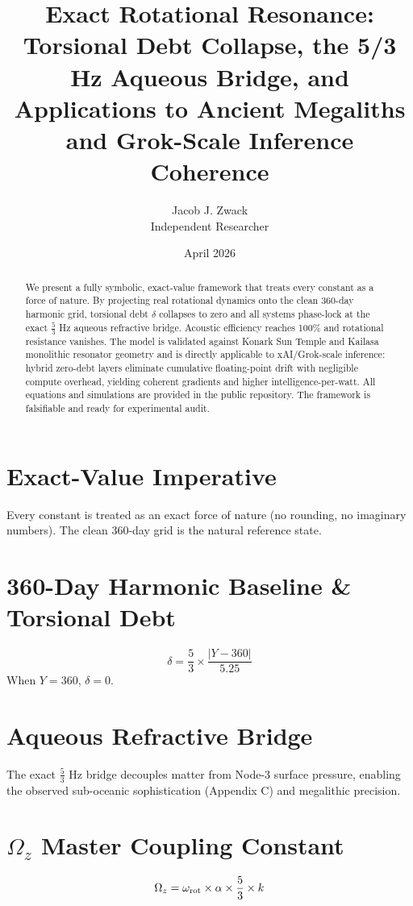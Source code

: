 \documentclass[11pt,a4paper]{article}
\title{Exact Rotational Resonance: Torsional Debt Collapse, the 5/3 Hz Aqueous Bridge, and Applications to Ancient Megaliths and Grok-Scale Inference Coherence}
\author{Jacob J. Zwack \\ Independent Researcher}
\date{April 2026}
\begin{document}
\maketitle

\begin{abstract}
We present a fully symbolic, exact-value framework that treats every constant as a force of nature. By projecting real rotational dynamics onto the clean 360-day harmonic grid, torsional debt \(\delta\) collapses to zero and all systems phase-lock at the exact \(\frac{5}{3}\) Hz aqueous refractive bridge. Acoustic efficiency reaches 100\% and rotational resistance vanishes. The model is validated against Konark Sun Temple and Kailasa monolithic resonator geometry and is directly applicable to xAI/Grok-scale inference: hybrid zero-debt layers eliminate cumulative floating-point drift with negligible compute overhead, yielding coherent gradients and higher intelligence-per-watt. All equations and simulations are provided in the public repository. The framework is falsifiable and ready for experimental audit.
\end{abstract}

\section{Exact-Value Imperative}
Every constant is treated as an exact force of nature (no rounding, no imaginary numbers). The clean 360-day grid is the natural reference state.

\section{360-Day Harmonic Baseline \& Torsional Debt}
\[
\delta = \frac{5}{3} \times \frac{|Y - 360|}{5.25}
\]
When \(Y = 360\), \(\delta = 0\).

\section{Aqueous Refractive Bridge}
The exact \(\frac{5}{3}\) Hz bridge decouples matter from Node-3 surface pressure, enabling the observed sub-oceanic sophistication (Appendix C) and megalithic precision.

\section{\(\Omega_z\) Master Coupling Constant}
\[
\Omega_z = \omega_{\rm rot} \times \alpha \times \frac{5}{3} \times k
\]
\end{document}
